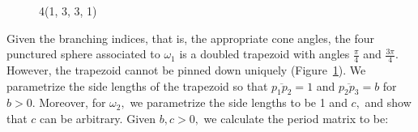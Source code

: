 \documentclass[12pt,reqno]{amsart}
\theoremstyle{definition}
\theoremstyle{remark}
\begin{document}
\begin{figure}[htbp]
    \centering
    \qquad
   \qquad
    \caption{4(1, 3, 3, 1)}%
    \label{fig:1331}%
\end{figure}

Given the branching indices, that is, the appropriate cone angles, the four punctured sphere associated to $\omega_1$ is a doubled trapezoid with angles $\frac{\pi}{4}$ and $\frac{3 \pi}{4}.$ However, the trapezoid cannot be pinned down uniquely (Figure~\ref{fig:1331}). We parametrize the side lengths of the trapezoid so that $\overline{p_1 p_2} = 1$ and $\overline{p_2 p_3} = b$ for $b > 0.$ Moreover, for $\omega_2,$ we parametrize the side lengths to be 1 and $c,$ and show that $c$ can be arbitrary. Given $b, c >0,$ we calculate the period matrix to be:
\end{document}

